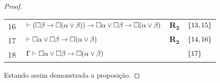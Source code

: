 \begin{tcolorbox}[enhanced jigsaw, breakable, sharp corners, colframe=black, colback=white, boxrule=0.5pt, left=1.5mm, right=1.5mm, top=1.5mm, bottom=1.5mm]
\begin{lemma}
\begin{proof}
\begin{xltabular}{\textwidth}{r | X l l}
            \scriptsize{16}\phantom{ }           & $\ \vdash(\nec\beta\to\nec(\alpha\vee\beta))\to\nec\alpha\vee\nec\beta\to\nec(\alpha\vee\beta)$                                        & $\hyperref[modal.rule.2]{\mathbf{R_2}}$        & $\left\{13,15\right\}$\\[\rowskip]
            \scriptsize{17}\phantom{ }           & $\ \vdash\nec\alpha\vee\nec\beta\to\nec(\alpha\vee\beta)$                                                                              & $\hyperref[modal.rule.2]{\mathbf{R_2}}$        & $\left\{14,16\right\}$\\[\rowskip]
            \scriptsize{18}\phantom{ }           & $\ \Gamma\vdash\nec\alpha\vee\nec\beta\to\nec(\alpha\vee\beta)$                                                                        & \phantom{1}                & $\left\{17\right\}$
        \end{xltabular}
        \normalsize

        \vspace{0.5\baselineskip}
        Estando assim demonstrada a proposição.
        \end{proof}
    \end{lemma}
\end{tcolorbox}
\vspace{.5\baselineskip}

